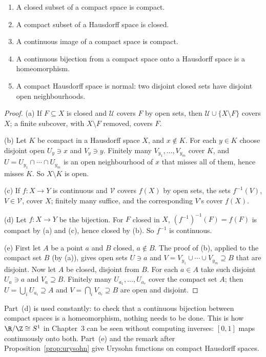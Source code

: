 \begin{proposition}\label{prop:compactbasic}
\begin{enumerate}[label=(\alph*)]
\item A closed subset of a compact space is compact.
\item A compact subset of a Hausdorff space is closed.
\item A continuous image of a compact space is compact.
\item A continuous bijection from a compact space onto a Hausdorff space is a homeomorphism.
\item A compact Hausdorff space is normal: two disjoint closed sets have disjoint open neighbourhoods.
\end{enumerate}
\end{proposition}
\begin{proof}
(a) If $F\subseteq X$ is closed and $\mathcal U$ covers $F$ by open sets, then $\mathcal U\cup\{X\setminus F\}$ covers $X$; a finite subcover, with $X\setminus F$ removed,
covers $F$.

(b) Let $K$ be compact in a Hausdorff space $X$, and $x\notin K$. For each $y\in K$ choose disjoint open $U_y\ni x$ and $V_y\ni y$. Finitely many $V_{y_1},\dots,V_{y_m}$
cover $K$, and $U=U_{y_1}\cap\cdots\cap U_{y_m}$ is an open neighbourhood of $x$ that misses all of them, hence misses $K$. So $X\setminus K$ is open.

(c) If $f:X\to Y$ is continuous and $\mathcal V$ covers $f(X)$ by open sets, the sets $f^{-1}(V)$, $V\in\mathcal V$, cover $X$; finitely many suffice, and the
corresponding $V$'s cover $f(X)$.

(d) Let $f:X\to Y$ be the bijection. For $F$ closed in $X$, $(f^{-1})^{-1}(F)=f(F)$ is compact by (a) and (c), hence closed by (b). So $f^{-1}$ is continuous.

(e) First let $A$ be a point $a$ and $B$ closed, $a\notin B$. The proof of (b), applied to the compact set $B$ (by (a)), gives open sets $U\ni a$ and
$V=V_{y_1}\cup\cdots\cup V_{y_m}\supseteq B$ that are disjoint. Now let $A$ be closed, disjoint from $B$. For each $a\in A$ take such disjoint $U_a\ni a$ and $V_a\supseteq B$.
Finitely many $U_{a_1},\dots,U_{a_r}$ cover the compact set $A$; then $U=\bigcup_iU_{a_i}\supseteq A$ and $V=\bigcap_iV_{a_i}\supseteq B$ are open and disjoint.
\end{proof}

Part~(d) is used constantly: to check that a continuous bijection between compact spaces is a homeomorphism, nothing needs
to be done. This is how $\R/\Z\cong S^1$ in Chapter~3 can be seen without computing inverses: $[0,1]$ maps continuously onto both.
Part~(e) and the remark after Proposition~\ref{prop:urysohn} give Urysohn functions on compact Hausdorff spaces.


